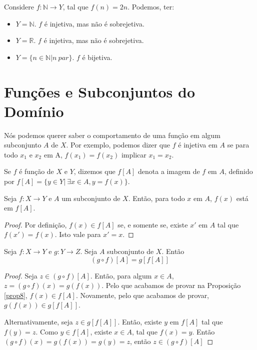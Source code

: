 \begin{example}
    Considere $f: \mathbb{N} \to Y$, tal que $f(n) = 2n$. Podemos, ter:
    \begin{itemize}
        \item $Y = \mathbb{N}$. $f$ é injetiva, mas não é sobrejetiva. 
        \item $Y = \mathbb{R}$. $f$ é injetiva, mas não é sobrejetiva.
        \item $Y = \{n \in \mathbb{N} | n~par\}$. $f$ é bijetiva. 
    \end{itemize} 
\end{example}

\section{Funções e Subconjuntos do Domínio}

Nós podemos querer saber o comportamento de uma função em algum subconjunto
$A$ de  $X$. Por exemplo, podemos dizer que $f$ é injetiva em $A$ se para 
todo $x_1$ e $x_2$ em A, $f(x_1) = f(x_2) $ implicar $x_1 = x_2 $. 

\begin{definition}
    \label{def8}
    Se $f$ é função de $X$ e $Y$, dizemos que $f[A]$ denota a imagem de $f$ em 
    $A$, definido por $f[A] = \{y \in Y | ~\exists x \in A, y = f(x)\}$.        
\end{definition}

\begin{theorem}
    \label{prop7}
    Seja $f: X \to Y $ e $A$ um subconjunto de $X$. Então, para todo $x$ em 
    $A$, $f(x)$ está em $f[A]$. 
\end{theorem}

\begin{proof}
    Por definição, $f(x) \in f[A] $ se, e somente se, existe $x'$ em $A$ tal que
    $f(x') = f(x)$. Isto vale para  $x' = x $. 
\end{proof}

\begin{theorem}
    \label{prop8}
    Seja $f: X \to Y$ e $g: Y \to Z$. Seja $A$ subconjunto de $X$. Então
    $$(g \circ f)[A] = g[f[A]]$$ 
\end{theorem}

\begin{proof}
    Seja $z \in (g \circ f)[A]$. Então, para algum $x \in A$, $z = (g \circ f)(x) = g(f(x))$.
    Pelo que acabamos de provar na Proposição \ref{prop8}, $f(x) \in f[A]$. Novamente, pelo 
    que acabamos de provar, $g(f(x)) \in g[f[A]] $. 
    
    Alternativamente, seja $z \in g[f[A]]$. Então, existe $y$ em $f[A]$ tal que 
    $f(y) = z$. Como $y \in f[A]$, existe $x \in A$, tal que $f(x) = y$. Então 
    $(g \circ f)(x) = g(f(x)) = g(y) = z$, então $z \in (g \circ f)[A] $
\end{proof}

